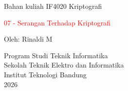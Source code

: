 \documentclass{article}
\begin{document}

\begin{center}
Bahan kuliah IF4020 Kriptografi

\Huge \textcolor{red}{07 - Serangan Terhadap Kriptografi}

\vspace{40mm}

\Large Oleh: Rinaldi M

\vspace{10mm}

\large Program Studi Teknik Informatika \\
Sekolah Teknik Elektro dan Informatika \\
Institut Teknologi Bandung \\
2026
\end{center}
\end{document}
